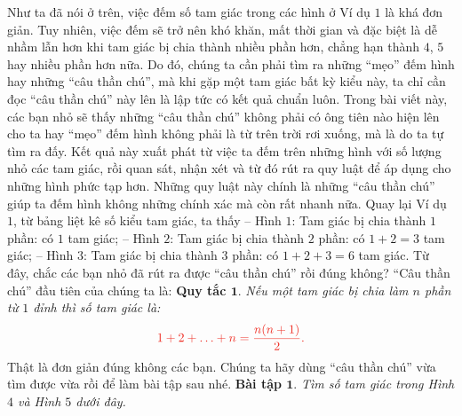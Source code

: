 	Như ta đã nói ở trên, việc đếm số tam giác trong các hình ở Ví dụ $1$ là khá đơn giản. Tuy nhiên, việc đếm sẽ trở nên khó khăn, mất thời gian và đặc biệt là dễ nhầm lẫn hơn khi tam giác bị chia thành nhiều phần hơn, chẳng hạn thành $4$, $5$ hay nhiều phần hơn nữa. Do đó, chúng ta cần phải tìm ra những “mẹo” đếm hình hay những “câu thần chú”, mà khi gặp một tam giác bất kỳ kiểu này, ta chỉ cần đọc “câu thần chú” này lên là lập tức có kết quả chuẩn luôn. 
	\vskip 0.1cm
	Trong bài viết này, các bạn nhỏ sẽ thấy những “câu thần chú” không phải có ông tiên nào hiện lên cho ta hay “mẹo” đếm hình không phải là từ trên trời rơi xuống, mà là do ta tự tìm ra đấy. Kết quả này xuất phát từ việc ta đếm trên những hình với số lượng nhỏ các tam giác, rồi quan sát, nhận xét và từ đó rút ra quy luật để áp dụng cho những hình phức tạp hơn. Những quy luật này chính là những “câu thần chú” giúp ta đếm hình không những chính xác mà còn rất nhanh nữa. 
	\vskip 0.1cm
	Quay lại Ví dụ $1$, từ bảng liệt kê số kiểu tam giác, ta thấy
	\vskip 0.1cm
	-- Hình $1$: Tam giác bị chia thành $1$ phần: có $1$ tam giác;
	\vskip 0.1cm
	-- Hình $2$: Tam giác bị chia thành $2$ phần: có $1 + 2 = 3$ tam giác;
	\vskip 0.1cm
	-- Hình $3$: Tam giác bị chia thành $3$ phần: có $1 + 2 + 3 = 6$ tam giác.
	\vskip 0.1cm
	Từ đây, chắc các bạn nhỏ đã rút ra được “câu thần chú” rồi đúng không? “Câu thần chú” đầu tiên của chúng ta là:
	\vskip 0.1cm
	\textbf{\color{toancuabi}Quy tắc $\pmb{1.}$}  \textit{Nếu một tam giác bị chia làm ${n}$ phần từ $1$ đỉnh thì số tam giác là:}
	\begin{align*}
	\color{toanhocdoisong} 1+2+\ldots+n = \frac{n(n+1)}{2}.
	\end{align*}
	Thật là đơn giản đúng không các bạn. Chúng ta hãy dùng “câu thần chú” vừa tìm được vừa rồi để làm bài tập sau nhé.
	\vskip 0.1cm
	\textbf{\color{toancuabi}Bài tập $\pmb{1.}$} \textit{Tìm số tam giác trong Hình $4$ và Hình $5$ dưới đây.}
	\begin{figure}[H]
		\centering
		\vspace*{-5pt}
		\captionsetup{labelformat= empty, justification=centering}
		\captionsetup[subfigure]{labelformat=empty}
		\hfill
		\hfill
		\hfill
		\vspace*{-10pt}
	\end{figure}   
